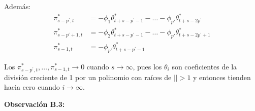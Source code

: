 Adem\'{a}s:
\begin{align*}
\pi_{s-p^{'},t}^{\ast} &= -\phi_{1}\theta_{t+s-p^{'}-1}^{\ast} -\ldots -\phi_{p'} \theta_{t+s-2p^{'}}^{\ast}\\
\pi_{s-p^{'}+1,t}^{\ast} &= -\phi_{2}\theta_{t+s-p^{'}-1}^{\ast } -\ldots -\phi_{p'} \theta_{t+s-2p^{'}+1}^{\ast}\\
\pi_{s-1,t}^{\ast } &= -\phi_{p'}\theta_{t+s-p^{'}-1}^{\ast } 
\end{align*}

Los $\pi_{s-p^{'},t}^{\ast },\ldots,\pi_{s-1,t}^{\ast} \to 0$ cuando $s\to \infty$, pues los $\theta_{i}$ son coeficientes de la divisi\'{o}n creciente de 1 por un polinomio con ra\'{i}ces de $\left| \right|>1$ y entonces tienden hacia cero cuando $i\to \infty$.\newline

\textbf{Observaci\'{o}n B.3:}

